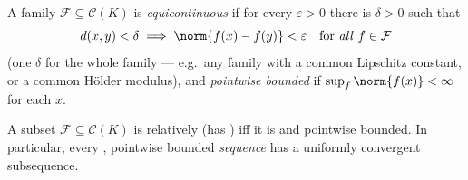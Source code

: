 \begin{definition}\label{def:b3:complete:equicontinuous}
A family $\mathcal F \subseteq \mathcal C(K)$ is
\emph{equicontinuous} if for every
$\varepsilon > 0$ there is $\delta > 0$ such that
\[
d(x, y) < \delta \implies \norm{f(x) - f(y)} < \varepsilon
\quad\text{for \emph{all} } f \in \mathcal F
\]
(one $\delta$ for the whole family --- e.g.\ any family with a
common Lipschitz constant, or a common H\"older modulus), and
\emph{pointwise bounded} if $\sup_{f}\norm{f(x)} < \infty$ for
each $x$.
\end{definition}

\begin{theorem}\label{thm:b3:complete:ascoli}
A subset $\mathcal F \subseteq \mathcal C(K)$ is relatively
 (has  ) iff it is  and
pointwise bounded. In particular, every ,
pointwise bounded \emph{sequence} has a uniformly convergent
subsequence.
\end{theorem}

